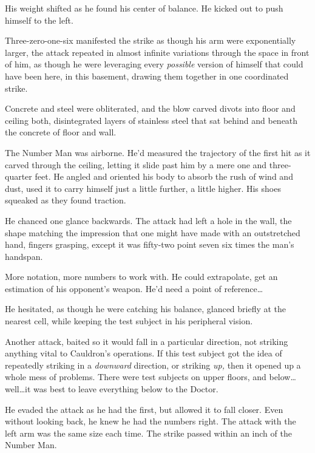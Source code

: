 His weight shifted as he found his center of balance.  He kicked out to push himself to the left.



Three-zero-one-six manifested the strike as though his arm were exponentially larger, the attack repeated in almost infinite variations through the space in front of him, as though he were leveraging every \emph{possible} version of himself that could have been here, in this basement, drawing them together in one coordinated strike.



Concrete and steel were obliterated, and the blow carved divots into floor and ceiling both, disintegrated layers of stainless steel that sat behind and beneath the concrete of floor and wall.



The Number Man was airborne.  He'd measured the trajectory of the first hit as it carved through the ceiling, letting it slide past him by a mere one and three-quarter feet.  He angled and oriented his body to absorb the rush of wind and dust, used it to carry himself just a little further, a little higher.  His shoes squeaked as they found traction.



He chanced one glance backwards.  The attack had left a hole in the wall, the shape matching the impression that one might have made with an outstretched hand, fingers grasping, except it was fifty-two point seven six times the man's handspan.



More notation, more numbers to work with.  He could extrapolate, get an estimation of his opponent's weapon.  He'd need a point of reference\ldots



He hesitated, as though he were catching his balance, glanced briefly at the nearest cell, while keeping the test subject in his peripheral vision.



Another attack, baited so it would fall in a particular direction, not striking anything vital to Cauldron's operations.  If this test subject got the idea of repeatedly striking in a \emph{downward} direction, or striking \emph{up, } then it opened up a whole mess of problems.  There were test subjects on upper floors, and below\ldots well\ldots it was best to leave everything below to the Doctor.



He evaded the attack as he had the first, but allowed it to fall closer.  Even without looking back, he knew he had the numbers right.  The attack with the left arm was the same size each time.  The strike passed within an inch of the Number Man.




